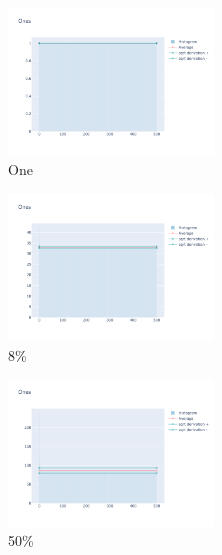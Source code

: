\documentclass[12pt, fleqn]{report}                             %
\theoremstyle{break}                                            %
\begin{document}
      \begin{figure}[ht!]
        \centering
        \begin{subfigure}[b]{0.4\linewidth}
          \includegraphics[width=0.6\textwidth]{Images/130/dia-a.png}
          \caption{One}
        \end{subfigure}
        \begin{subfigure}[b]{0.4\linewidth}
          \includegraphics[width=0.6\textwidth]{Images/130/dia-b.png}
          \caption{8\%}
        \end{subfigure}
        \begin{subfigure}[b]{0.4\linewidth}
          \includegraphics[width=0.6\textwidth]{Images/130/dia-c.png}
          \caption{50\%}
        \end{subfigure}
        \begin{subfigure}[b]{0.4\linewidth}

\end{subfigure}
\end{figure}
\end{document}
